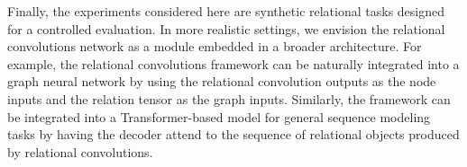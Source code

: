 Finally, the experiments considered here are synthetic relational tasks designed for a controlled evaluation. In more realistic settings, we envision the relational convolutions network as a module embedded in a broader architecture. For example, the relational convolutions framework can be naturally integrated into a graph neural network by using the relational convolution outputs as the node inputs and the relation tensor as the graph inputs. Similarly, the framework can be integrated into a Transformer-based model for general sequence modeling tasks by having the decoder attend to the sequence of relational objects produced by relational convolutions.